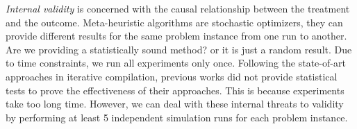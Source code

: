 \textit{Internal validity} is concerned with the causal relationship between the treatment and the outcome. Meta-heuristic algorithms are stochastic optimizers, they can provide different results for the same problem instance from one run to another. Are we providing a statistically sound method? or it is just a random result. Due to time constraints, we run all experiments only once. Following the state-of-art approaches in iterative compilation, previous works\cite{hoste2008cole,martinez2014multi} did not provide statistical tests to prove the effectiveness of their approaches. This is because experiments take too long time. However, we can deal with these internal threats to validity by performing at least 5 independent simulation runs for each problem instance.
 
 

 

